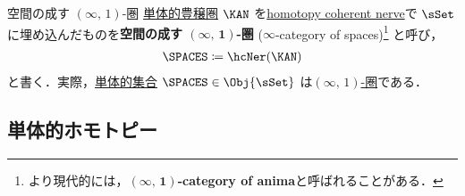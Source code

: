 \documentclass[TQFT_main]{subfiles}
\begin{document}
\begin{myexample}[label=def:Spaces]{空間の成す {$(\infty,\, 1)$}-圏}
    \hyperref[def:SimpCat]{単体的豊穣圏} $\KAN$ を\hyperref[def:nerve-hc]{homotopy coherent nerve}で $\sSet$ に埋め込んだものを\textbf{空間の成す $\bm{(\infty,\, 1)}$-圏} ($\infty$-category of spaces)\footnote{より現代的には，$\bm{(\infty,\, 1)}$\textbf{-category of anima}と呼ばれることがある．} と呼び，
    \begin{align}
         \SPACES \coloneqq \hcNer (\KAN)
    \end{align}
    と書く．実際，\hyperref[def:SimpSet]{単体的集合} $\SPACES \in \Obj{\sSet}$ は\hyperref[def:infinity-1]{$(\infty,\, 1)$-圏}である\cite[\href{https://kerodon.net/tag/01YY}{Tag 01YY}]{kerodon}．
\end{myexample}


\subsection{単体的ホモトピー}
\end{document}
